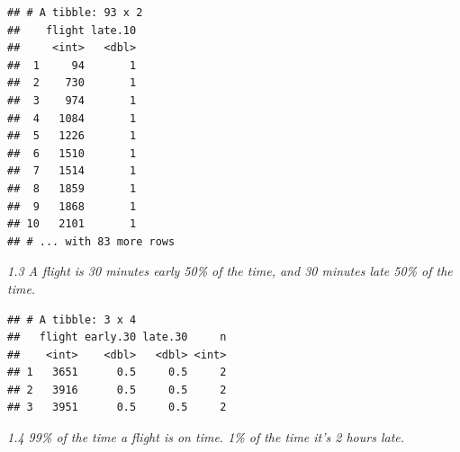 \documentclass[]{book}
\newenvironment{Shaded}{\begin{snugshade}}{\end{snugshade}}
\newcommand{\CommentTok}[1]{\textcolor[rgb]{0.56,0.35,0.01}{\textit{#1}}}
\newcommand{\DataTypeTok}[1]{\textcolor[rgb]{0.13,0.29,0.53}{#1}}
\newcommand{\DecValTok}[1]{\textcolor[rgb]{0.00,0.00,0.81}{#1}}
\newcommand{\FloatTok}[1]{\textcolor[rgb]{0.00,0.00,0.81}{#1}}
\newcommand{\KeywordTok}[1]{\textcolor[rgb]{0.13,0.29,0.53}{\textbf{#1}}}
\newcommand{\NormalTok}[1]{#1}
\newcommand{\OperatorTok}[1]{\textcolor[rgb]{0.81,0.36,0.00}{\textbf{#1}}}
\newcommand{\OtherTok}[1]{\textcolor[rgb]{0.56,0.35,0.01}{#1}}
\newcommand{\StringTok}[1]{\textcolor[rgb]{0.31,0.60,0.02}{#1}}
\theoremstyle{definition}
\theoremstyle{definition}
\theoremstyle{definition}
\theoremstyle{remark}
\begin{document}
\begin{verbatim}
## # A tibble: 93 x 2
##    flight late.10
##     <int>   <dbl>
##  1     94       1
##  2    730       1
##  3    974       1
##  4   1084       1
##  5   1226       1
##  6   1510       1
##  7   1514       1
##  8   1859       1
##  9   1868       1
## 10   2101       1
## # ... with 83 more rows
\end{verbatim}

\emph{1.3 A flight is 30 minutes early 50\% of the time, and 30 minutes
late 50\% of the time.}

\begin{Shaded}
\end{Shaded}

\begin{verbatim}
## # A tibble: 3 x 4
##   flight early.30 late.30     n
##    <int>    <dbl>   <dbl> <int>
## 1   3651      0.5     0.5     2
## 2   3916      0.5     0.5     2
## 3   3951      0.5     0.5     2
\end{verbatim}

\emph{1.4 99\% of the time a flight is on time. 1\% of the time it's 2
hours late.}
\end{document}
